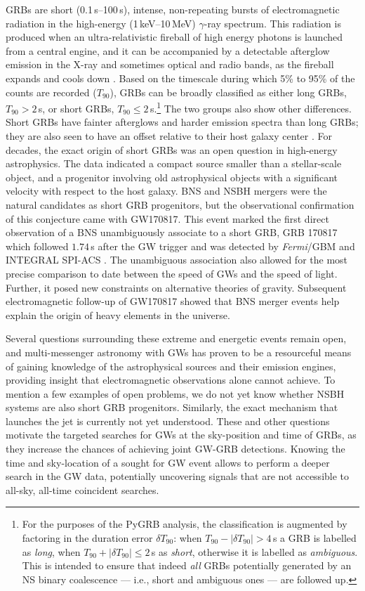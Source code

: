 \documentclass[binding=0.6cm, LaM]{sapthesis}
\begin{document}
	GRBs are short (0.1\,s--100\,s), intense, non-repeating bursts of 
	electromagnetic radiation in the high-energy (1\,keV--10\,MeV) $\gamma$-ray spectrum.
	This radiation is produced when an ultra-relativistic fireball of high energy photons 
	is launched from a central engine, and it can be accompanied by a detectable afterglow emission 
	in the X-ray and sometimes optical and radio bands, as the fireball expands and cools down \cite{139}.
	Based on the timescale during which 5\% to 95\% of the counts are recorded ($T_{90}$), GRBs can be broadly classified
	as either long GRBs, $T_{90} > 2\,$s, or short GRBs, $T_{90} \leq 2\,$s.\footnote{For the purposes of the {\ttfamily PyGRB} analysis, 
	the classification is augmented by factoring in the duration error $\delta T_{90}$: 
        when $T_{90}-|\delta T_{90}| > 4\,$s a GRB is labelled as {\it long},
	when $T_{90}+|\delta T_{90}| \leq 2\,$s as {\it short},
        otherwise it is labelled as {\it ambiguous}.  
	This is intended to ensure that indeed {\it all} GRBs potentially generated by an NS binary coalescence 
	--- i.e., short and ambiguous ones --- are followed up.}
	The two groups also show other differences.
	Short GRBs have fainter afterglows and harder emission spectra than long GRBs; 
	they are also seen to have an offset relative to their host galaxy center \cite{154}.
	For decades, the exact origin of short GRBs was an open question in high-energy astrophysics.
	The data indicated a compact source smaller than a stellar-scale object, 
	and a progenitor involving old astrophysical objects with a significant velocity with respect to the host galaxy.
	BNS and NSBH mergers were the natural candidates as short GRB progenitors, 
	but the observational confirmation of this conjecture came with GW170817.
	This event marked the first direct observation of a BNS unambiguously associate to a short GRB, 
	GRB 170817 which followed $1.74\,$s after the GW trigger and was detected by {\it Fermi}/GBM and INTEGRAL SPI-ACS \cite{15}.
	The unambiguous association also allowed for the most precise comparison to date
	between the speed of GWs and the speed of light.
	Further, it posed new constraints on alternative theories of gravity. 
	Subsequent electromagnetic follow-up of GW170817 showed that BNS merger events 
	help explain the origin of heavy elements in the universe.

	Several questions surrounding these extreme and energetic events remain open, 
	and multi-messenger astronomy with GWs has proven to be a resourceful means of gaining 
	knowledge of the astrophysical sources and their emission engines, 
	providing insight that electromagnetic observations alone cannot achieve.
	To mention a few examples of open problems, we do not yet know whether NSBH systems are also short GRB progenitors.
	Similarly, the exact mechanism that launches the jet is currently not yet understood.
        These and other questions motivate the targeted searches for GWs at the sky-position and time of GRBs, 
	as they increase the chances of achieving joint GW-GRB detections.
	Knowing the time and sky-location of a sought for GW event
	allows to perform a deeper search in the GW data, potentially uncovering signals 
	that are not accessible to all-sky, all-time coincident searches.
\end{document}

